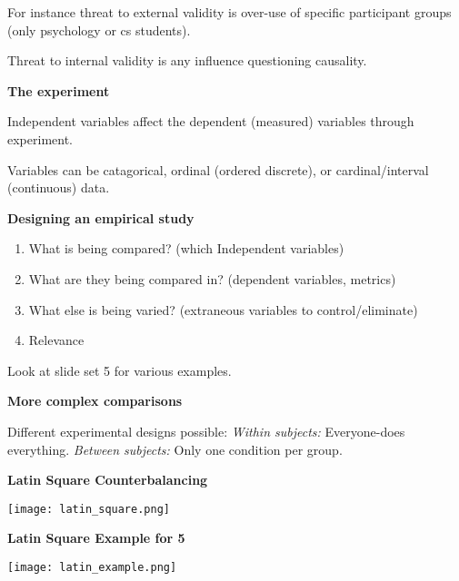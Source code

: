 For instance threat to external validity is over-use of specific participant groups (only psychology or cs students). \medskip

Threat to internal validity is any influence questioning causality. 


\textbf{The experiment}

Independent variables affect the dependent (measured) variables through experiment.

Variables can be catagorical, ordinal (ordered discrete), or cardinal/interval (continuous) data. \medskip

\textbf{Designing an empirical study}

\begin{enumerate}
    \item What is being compared? (which Independent variables)
    \item What are they being compared in? (dependent variables, metrics)
    \item What else is being varied? (extraneous variables to control/eliminate)
    \item Relevance
\end{enumerate}

Look at slide set 5 for various examples. \medskip

\textbf{More complex comparisons}

Different experimental designs possible: \textit{Within subjects:} Everyone-does everything. \textit{Between subjects:} Only one condition per group. \medskip

\textbf{Latin Square Counterbalancing}

\begin{center}
	\texttt{[image: latin\_square.png]}
\end{center}


\textbf{Latin Square Example for 5}

\begin{center}
	\texttt{[image: latin\_example.png]}
\end{center}

\columnbreak